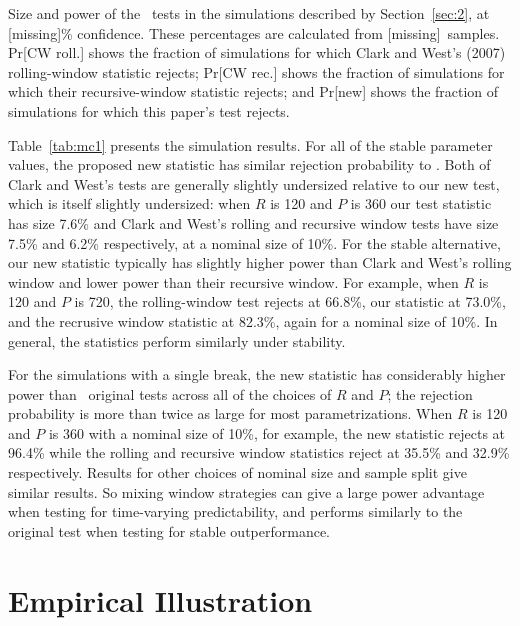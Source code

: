 \documentclass[12pt,fleqn]{article}
\providecommand\testsize{[missing]}
\providecommand\totalsims{[missing]}
\begin{document}
\begin{table}[tb]
  \centering
  
  \caption{Size and power of the \oos\ tests in the simulations 
    described by Section~\ref{sec:2}, at
    \testsize\% confidence.  These percentages are calculated from \totalsims\
    samples.  Pr[CW roll.] shows the fraction of simulations for
    which Clark and West's (2007) rolling-window statistic rejects; 
    Pr[CW rec.] shows the fraction of simulations for which
    their recursive-window statistic rejects; and Pr[new] shows the fraction of
    simulations for which this paper's test rejects.}
\label{tab:mc1}
\end{table}

Table~\ref{tab:mc1} presents the simulation results.  For all of the
stable parameter values, the proposed new statistic has similar
rejection probability to .  Both of Clark and West's
tests are generally slightly undersized relative to our new test,
which is itself slightly undersized: when $R$ is 120 and $P$ is 360
our test statistic has size 7.6\% and Clark and West's rolling and
recursive window tests have size 7.5\% and 6.2\% respectively, at a
nominal size of 10\%.  For the stable alternative, our new statistic
typically has slightly higher power than Clark and West's rolling
window and lower power than their recursive window.  For example, when
$R$ is 120 and $P$ is 720, the rolling-window test rejects at 66.8\%,
our statistic at 73.0\%, and the recrusive window statistic at 82.3\%,
again for a nominal size of 10\%.  In general, the statistics perform
similarly under stability.

For the simulations with a single break, the new statistic has
considerably higher power than \poscw\ original tests across all of
the choices of $R$ and $P$; the rejection probability is more than
twice as large for most parametrizations.  When $R$ is 120 and $P$ is
360 with a nominal size of 10\%, for example, the new statistic
rejects at 96.4\% while the rolling and recursive window statistics
reject at 35.5\% and 32.9\% respectively.  Results for other choices
of nominal size and sample split give similar results.  So mixing
window strategies can give a large power advantage when testing for
time-varying predictability, and performs similarly to the original
test when testing for stable outperformance.

\section{Empirical Illustration}\label{sec:3}
\end{document}
